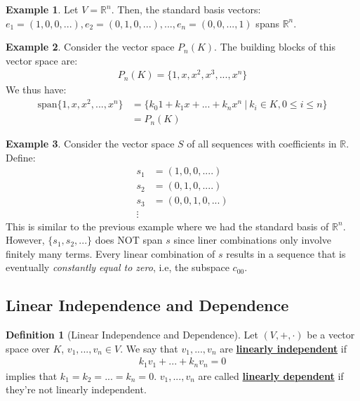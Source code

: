 \documentclass[11pt]{scrartcl}
\newcommand{\R}[0]{\mathbb{R}}
\theoremstyle{definition}
\newtheorem{definition}{Definition}
\newtheorem{ex}{Example}
\theoremstyle{remark}
\newcommand{\dfn}[1]{\textbf{\underline{#1}}}
\newcommand{\vsok}[0]{Let $(V, +, \cdot)$ be a vector space over $K$}
\begin{document}
\begin{ex}
	Let $V = \R^n$. Then, the standard basis vectors: $e_1 = (1, 0, 0, ...), e_2 = (0,1,0, ...), ..., e_n = (0, 0, ..., 1)$ spans $\R^n$. 	
\end{ex}

\begin{ex}
Consider the vector space $P_n(K)$. The building blocks of this vector space are: 
\begin{align*}
	P_n(K) = \{ 1, x, x^2, x^3, ..., x^n \} 
\end{align*}
We thus have: 
\begin{align*}
	\text{span} \{ 1, x, x^2, ..., x^n \} & = \{ k_0 1 + k_1 x + ... + k_n x^n\ |\ k_i \in K, 0 \leq i \leq n \} \\
		& = P_n(K) 
\end{align*}	
\end{ex}


\begin{ex} 
	Consider the vector space $S$ of all sequences with coefficients in $\R$. Define: 
	\begin{align*}
		s_1 &= (1,0,0,....) \\
		s_2 &= (0,1,0,....) \\
		s_3 & = (0,0,1,0,...) \\
		\vdots 
	\end{align*}	
	This is similar to the previous example where we had the standard basis of $\R^n$. However, $\{ s_1, s_2, ... \}$ does NOT span $s$ since liner combinations only involve finitely many terms. Every linear combination of $s$ results in a sequence that is eventually \emph{constantly equal to zero}, i.e, the subspace $c_{00}$. 
\end{ex}

\subsection{Linear Independence and Dependence}

\begin{definition}[Linear Independence and Dependence]
	\vsok, $v_1, ..., v_n \in V$. We say that $v_1, ..., v_n$ are \dfn{linearly independent} if 
	\begin{align*}
		k_1 v_1 + ... + k_n v_n =0 
	\end{align*}
	implies that $k_1 = k_2 = ... = k_n = 0 $. $v_1, ..., v_n$ are called \dfn{linearly dependent} if they're not linearly independent. 
\end{definition}
\end{document}
